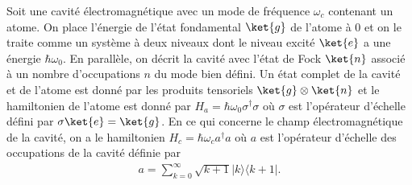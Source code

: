 {\footnotesize
Soit une cavité électromagnétique avec un mode de fréquence $\omega_c$ contenant un atome. On place l'énergie de l'état fondamental $\ket{g}$ de l'atome à $0$ et on le traite comme un système à deux niveaux dont le niveau excité $\ket{e}$ a une énergie $\hbar \omega_0$. En parallèle, on décrit la cavité avec l'état de Fock $\ket{n}$ associé à un nombre d'occupations $n$ du mode bien défini. Un état complet de la cavité et de l'atome est donné par les produits tensoriels $\ket{g} \otimes \ket{n}$ et le hamiltonien de l'atome est donné par $H_a = \hbar \omega_0\sigma^\dagger \sigma$ où $\sigma$ est l'opérateur d'échelle  défini par $\sigma \ket{e} = \ket{g}$. En ce qui concerne le champ électromagnétique de la cavité, on a le hamiltonien $H_c = \hbar \omega_c a^\dagger a$ où $a$ est l'opérateur d'échelle des occupations de la cavité définie par 
\begin{align}
a = \sum_{k=0}^{\infty} \sqrt{k+1}|k\rangle\langle k+1|. \label{a}
\end{align}

}
